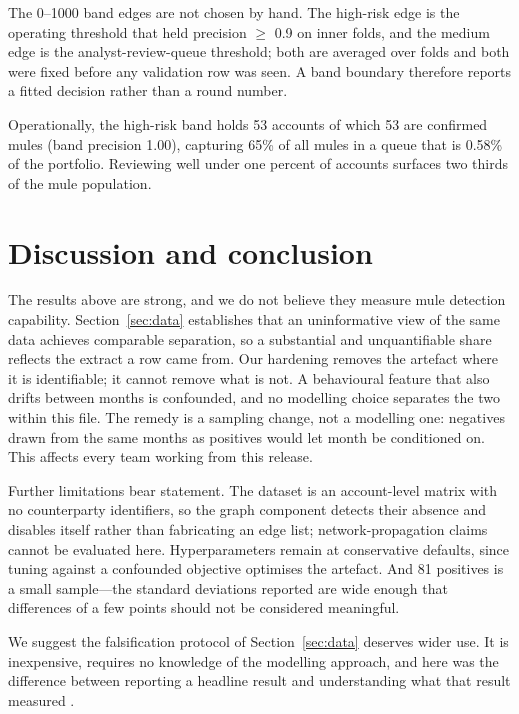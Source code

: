 \documentclass{article}
\begin{document}
The 0--1000 band edges are not chosen by hand. The high-risk edge is the
operating threshold that held precision $\geq$ 0.9 on inner
folds, and the medium edge is the analyst-review-queue threshold; both are
averaged over folds and both were fixed before any validation row was seen. A
band boundary therefore reports a fitted decision rather than a round number.

Operationally, the high-risk band holds 53 accounts of which
53 are confirmed mules (band precision
1.00), capturing 65\% of all
mules in a queue that is 0.58\% of the
portfolio. Reviewing well under one percent of accounts surfaces two thirds of
the mule population.

\section{Discussion and conclusion}
\label{sec:discussion}

The results above are strong, and we do not believe they measure mule detection
capability. Section~\ref{sec:data} establishes that an uninformative view of the
same data achieves comparable separation, so a substantial and unquantifiable
share reflects the extract a row came from. Our hardening removes the artefact
where it is identifiable; it cannot remove what is not. A behavioural feature
that also drifts between months is confounded, and no modelling choice separates
the two within this file. The remedy is a sampling change, not a modelling one:
negatives drawn from the same months as positives would let month be conditioned
on. This affects every team working from this release.

Further limitations bear statement. The dataset is an account-level matrix with
no counterparty identifiers, so the graph component detects their absence and
disables itself rather than fabricating an edge list; network-propagation claims
cannot be evaluated here. Hyperparameters remain at conservative defaults, since
tuning against a confounded objective optimises the artefact. And
81 positives is a small sample---the standard deviations reported are
wide enough that differences of a few points should not be considered
meaningful.

We suggest the falsification protocol of Section~\ref{sec:data} deserves wider
use. It is inexpensive, requires no knowledge of the modelling approach, and here
was the difference between reporting a headline result and understanding what
that result measured \cite{hackathon2026}.
\end{document}

